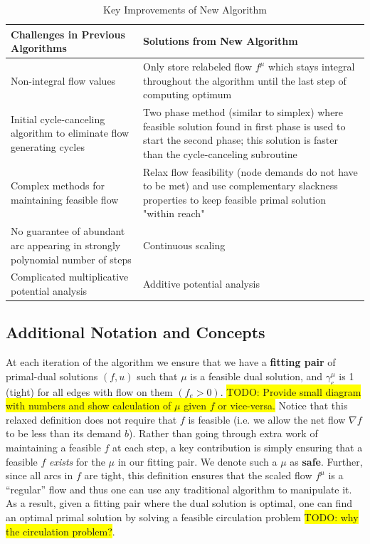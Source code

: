 \documentclass[12pt]{article}
\theoremstyle{definition}
\newcommand{\todo}[1]{\colorbox{yellow}{TODO: #1}}
\begin{document}
\begin{table}[H]
\begin{center}
    \begin{tabular}{ | p{7cm} | p{7cm} |}
    \hline
    Challenges in Previous Algorithms  & Solutions from New Algorithm \\ \hline
    Non-integral flow values & Only store relabeled flow $f^{\mu}$ which stays integral throughout the algorithm until the last step of computing optimum \\ \hline
    Initial cycle-canceling algorithm to eliminate flow generating cycles & Two phase method (similar to simplex) where feasible solution found in first phase is used to start the second phase; this solution is faster than the cycle-canceling subroutine \\ \hline
    Complex methods for maintaining feasible flow & Relax flow feasibility (node demands do not have to be met) and use complementary slackness properties to keep feasible primal solution "within reach" \\ \hline
    No guarantee of abundant arc appearing in strongly polynomial number of steps \cite{Radzik2004} &  Continuous scaling\\ \hline
    Complicated multiplicative potential analysis \cite{Vegh2013} & Additive potential analysis \\
    \hline
    \end{tabular}
\end{center}
\caption{Key Improvements of New Algorithm}
\label{tab:improvements}
\end{table}
    \subsection{Additional Notation and Concepts}
At each iteration of the algorithm we ensure that we have a \textbf{fitting pair} of primal-dual solutions $(f,u)$ such that $\mu$ is a feasible dual solution, and $\gamma_e^{\mu}$ is 1 (tight) for all edges with flow on them $(f_e > 0)$. \todo{Provide small diagram with numbers and show calculation of $\mu$ given $f$ or vice-versa.} Notice that this relaxed definition does not require that $f$ is feasible (i.e. we allow the net flow $\nabla f $ to be less than its demand $b$). Rather than going through extra work of maintaining a feasible $f$ at each step, a key contribution is simply ensuring that a feasible $f$ \textit{exists} for the $\mu$ in our fitting pair. We denote such a $\mu$ as \textbf{safe}. Further, since all arcs in $f$ are tight, this definition ensures that the scaled flow $f^{\mu}$ is a ``regular'' flow and thus one can use any traditional algorithm to manipulate it. As a result, given a fitting pair where the dual solution is optimal, one can find an optimal primal solution by solving a feasible circulation problem \todo{why the circulation problem?}. 
\end{document}
